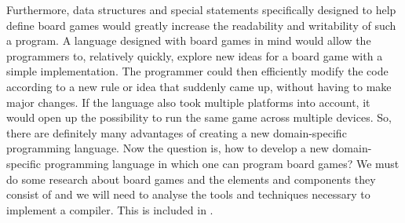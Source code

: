 Furthermore, data structures and special statements specifically designed to
help define board games would greatly increase the readability and writability
of such a program. A language designed with board games in mind would allow the
programmers to, relatively quickly, explore new ideas for a board game with a
simple implementation. The programmer could then efficiently modify the code
according to a new rule or idea that suddenly came up, without having to make
major changes. If the language also took multiple platforms into account, it
would open up the possibility to run the same game across multiple devices. So,
there are definitely many advantages of creating a new domain-specific
programming language. Now the question is, how to develop a new domain-specific
programming language in which one can program board games? We must do some
research about board games and the elements and components they consist of and
we will need to analyse the tools and techniques necessary to implement a
compiler. This is included in .
